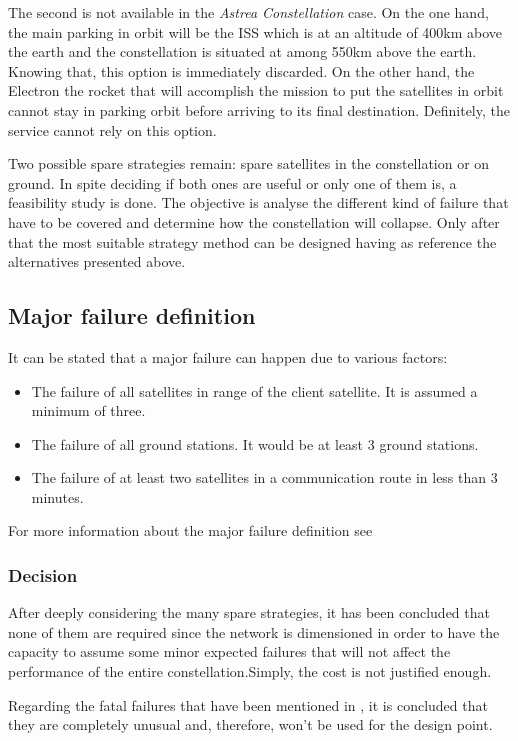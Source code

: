 The second is not available in the \textit{Astrea Constellation} case. On the one hand, the main parking in orbit will be the ISS which is at an altitude of 400km above the earth and the constellation is situated at among 550km above the earth. Knowing that, this option is immediately discarded. On the other hand, the Electron the rocket that will accomplish the mission to put the satellites in orbit cannot stay in parking orbit before arriving to its final destination. Definitely, the service cannot rely on this option.

Two possible spare strategies remain: spare satellites in the constellation or on ground. In spite deciding if both ones are useful or only one of them is, a feasibility study is done. The objective is analyse the different kind of failure that have to be covered and determine how the constellation will collapse. Only after that the most suitable strategy method can be designed having as reference the alternatives presented above. 

\subsection{Major failure definition}
It can be stated that a major failure can happen due to various factors:
\begin{itemize}
\item The failure of all satellites in range of the client satellite. It is assumed a minimum of three.
\item The failure of all ground stations. It would be at least 3 ground stations.
\item The failure of at least two satellites in a communication route in less than 3 minutes.
\end{itemize}
For more information about the major failure definition see \cite[Chapter 1, Section 4]{annex2}

\subsubsection{Decision}
After deeply considering the many spare strategies, it has been concluded that none of them are required since the network is dimensioned in order to have the capacity to assume some minor expected failures that will not affect the performance of the entire constellation.Simply, the cost is not justified enough.

Regarding the fatal failures that have been mentioned in \cite[Chaper 1. Section 1.4]{annex2}, it is concluded that they are completely unusual and, therefore, won't be used for the design point.

